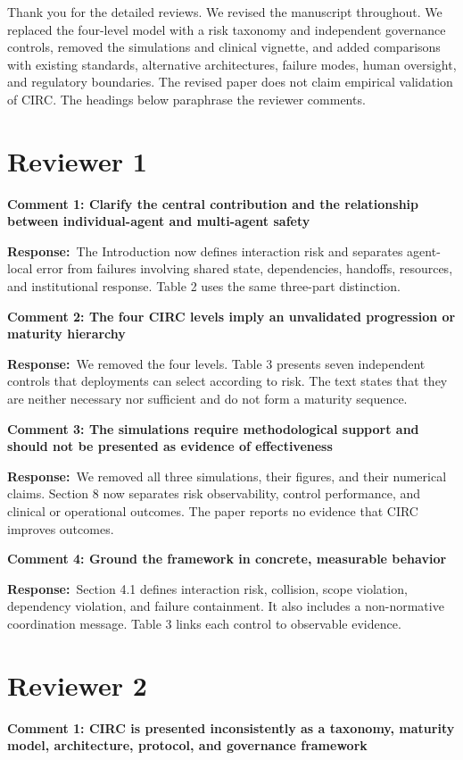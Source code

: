 \documentclass[11pt]{article}
\author{Bruce Changlong Xu, Ayush Chopra, and Alexander J. Ryu}
\date{}
\newcommand{\reviewer}[1]{\section*{#1}}
\newcommand{\comment}[1]{\par\medskip\noindent\textbf{#1}\par}
\newcommand{\response}{\noindent\textbf{Response:}\ }
\begin{document}
\maketitle

Thank you for the detailed reviews. We revised the manuscript throughout. We replaced the four-level
model with a risk taxonomy and independent governance controls, removed the simulations and clinical
vignette, and added comparisons with existing standards, alternative architectures, failure modes,
human oversight, and regulatory boundaries. The revised paper does not claim empirical validation of
CIRC. The headings below paraphrase the reviewer comments.

\reviewer{Reviewer 1}

\comment{Comment 1: Clarify the central contribution and the relationship between individual-agent and multi-agent safety}

\response The Introduction now defines interaction risk and separates agent-local error from failures
involving shared state, dependencies, handoffs, resources, and institutional response. Table 2 uses
the same three-part distinction.

\comment{Comment 2: The four CIRC levels imply an unvalidated progression or maturity hierarchy}

\response We removed the four levels. Table 3 presents seven independent controls that deployments
can select according to risk. The text states that they are neither necessary nor sufficient and do
not form a maturity sequence.

\comment{Comment 3: The simulations require methodological support and should not be presented as evidence of effectiveness}

\response We removed all three simulations, their figures, and their numerical claims. Section 8 now
separates risk observability, control performance, and clinical or operational outcomes. The paper
reports no evidence that CIRC improves outcomes.

\comment{Comment 4: Ground the framework in concrete, measurable behavior}

\response Section 4.1 defines interaction risk, collision, scope violation, dependency violation, and
failure containment. It also includes a non-normative coordination message. Table 3 links each control
to observable evidence.

\reviewer{Reviewer 2}

\comment{Comment 1: CIRC is presented inconsistently as a taxonomy, maturity model, architecture, protocol, and governance framework}
\end{document}
